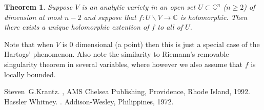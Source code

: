 \documentclass[12pt]{article}
\theoremstyle{theorem}
\newtheorem*{thm}{Theorem}
\theoremstyle{definition}
\theoremstyle{remark}
\begin{document}
\begin{thm}
Suppose $V$ is an analytic variety in an open set $U \subset {\mathbb{C}}^n$
($n \geq 2$)
of dimension at most $n-2$ and suppose that $f \colon U \backslash V \to
{\mathbb{C}}$ is holomorphic.  Then there exists a unique holomorphic 
extention of $f$ to all of $U$.
\end{thm}

Note that when $V$ is 0 dimensional (a point) then this is just a special 
case of the Hartogs' phenomenon.  Also note the similarity to Riemann's 
removable singularity theorem in several variables, where however we also assume that $f$ is locally bounded.

\begin{thebibliography}{9}
Steven~G.\@ Krantz.
{\em {}},
AMS Chelsea Publishing, Providence, Rhode Island, 1992.
Hassler Whitney.
{\em {}}.
Addison-Wesley, Philippines, 1972.
\end{thebibliography}
\end{document}
